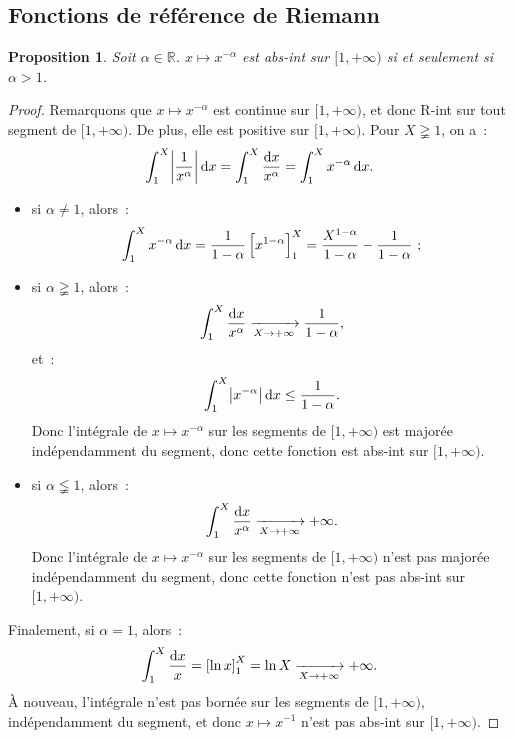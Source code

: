 \documentclass{report}
\newtheorem{prp}[thm]{Proposition}
\theoremstyle{definition}
\theoremstyle{remark}
\numberwithin{equation}{section}
\newcommand{\R}{\mathbb R}
\newcommand{\pinfty}{{+\infty}}
\begin{document}
		\subsection{Fonctions de référence de Riemann}
			\begin{prp} Soit $\alpha \in \R$. $x \mapsto x^{-\alpha}$ est abs-int sur $[1, \pinfty)$ si et seulement si $\alpha > 1$.
			\end{prp}

			\begin{proof} Remarquons que $x \mapsto x^{-\alpha}$ est continue sur $[1, \pinfty)$, et donc R-int sur tout segment de $[1, \pinfty)$. De plus,
			elle est positive sur $[1, \pinfty)$. Pour $X \gneqq 1$, on a~:
			\begin{equation}
				\int_1^X\abs {\frac 1{x^\alpha}}\dif x = \int_1^X \frac {\dif x}{x^\alpha} = \int_1^Xx^{-\alpha}\dif x.
			\end{equation}
			\begin{itemize}
				\item si $\alpha \neq 1$, alors~:
				\begin{equation}
					\int_1^Xx^{-\alpha}\dif x = \frac 1{1-\alpha}\left[x^{1-\alpha}\right]_1^X = \frac {X^{1-\alpha}}{1-\alpha} - \frac 1{1-\alpha}~;
				\end{equation}
				\item si $\alpha \gneqq 1$, alors~:
				\begin{equation}
					\int_1^X\frac {\dif x}{x^\alpha} \xrightarrow[X \to \pinfty]{} \frac 1{1-\alpha},
				\end{equation}
				et~:
				\begin{equation}
					\int_1^X\abs {x^{-\alpha}}\dif x \leq \frac 1{1-\alpha}.
				\end{equation}
				Donc l'intégrale de $x \mapsto x^{-\alpha}$ sur les segments de $[1, \pinfty)$ est majorée indépendamment du segment, donc cette fonction est abs-int sur
				$[1, \pinfty)$.
				\item si $\alpha \lneqq 1$, alors~:
				\begin{equation}
					\int_1^X \frac {\dif x}{x^\alpha} \xrightarrow[X \to \pinfty]{} \pinfty.
				\end{equation}
				Donc l'intégrale de $x \mapsto x^{-\alpha}$ sur les segments de $[1, \pinfty)$ n'est pas majorée indépendamment du segment, donc cette fonction n'est pas
				abs-int sur $[1, \pinfty)$.
			\end{itemize}

			Finalement, si $\alpha = 1$, alors~:
			\begin{equation}
				\int_1^X\frac {\dif x}x = \left[\ln x\right]_1^X = \ln X \xrightarrow[X \to \pinfty]{} \pinfty.
			\end{equation}
			À nouveau, l'intégrale n'est pas bornée sur les segments de $[1, \pinfty)$, indépendamment du segment, et donc $x \mapsto x^{-1}$ n'est pas abs-int sur
			$[1, \pinfty)$.
			\end{proof}
\end{document}
